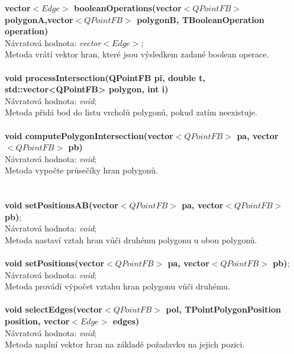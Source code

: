 \documentclass[a4paper, 12pt]{article}
\begin{document}
\textbf{vector$<Edge>$ booleanOperations(vector$<QPointFB>$ polygonA,vector$<QPointFB>$ polygonB, TBooleanOperation operation)}\\
Návratová hodnota: \textit{vector$<Edge>$};\\
Metoda vrátí vektor hran, které jsou výsledkem zadané boolean operace.\\ 
\\
\textbf{void processIntersection(QPointFB pi, double t, std::vector<QPointFB> polygon, int i)}\\
Návratová hodnota: \textit{void};\\
Metoda přidá bod do listu vrcholů polygonů, pokud zatím neexistuje.\\
\\
\textbf{void computePolygonIntersection(vector$<QPointFB>$ pa, vector$<QPointFB>$ pb)}\\
Návratová hodnota: \textit{void};\\
Metoda vypočte průsečíky hran polygonů.\\
\\
\\
\textbf{void setPositionsAB(vector$<QPointFB>$ pa, vector$<QPointFB>$ pb)};\\
Návratová hodnota: \textit{void};\\
Metoda nastaví vztah hran vůči druhému polygonu u obou polygonů.\\
\\
\textbf{void setPositions(vector$<QPointFB>$ pa, vector$<QPointFB>$ pb)};\\
Návratová hodnota: \textit{void};\\
Metoda provádí výpočet vztahu hran polygonu vůči druhému.\\
\\
\textbf{void selectEdges(vector$<QPointFB>$ pol, TPointPolygonPosition position, vector$<Edge>$ edges)}\\
Návratová hodnota: \textit{void};\\
Metoda naplní vektor hran na základě požadavku na jejich pozici. 
\end{document}
